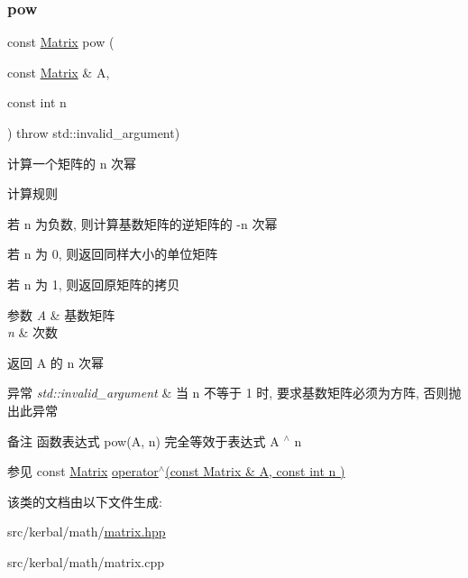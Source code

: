 \subsubsection{\texorpdfstring{pow}{pow}}
{\footnotesize\ttfamily const \hyperlink{classkerbal_1_1math_1_1_matrix}{Matrix} pow (\begin{DoxyParamCaption}\item[{const \hyperlink{classkerbal_1_1math_1_1_matrix}{Matrix} \&}]{A,  }\item[{const int}]{n }\end{DoxyParamCaption}) throw  std\+::invalid\+\_\+argument) \hspace{0.3cm}{\ttfamily [friend]}}



计算一个矩阵的 n 次幂 

\begin{DoxyParagraph}{计算规则}

\begin{DoxyItemize}
\item 若 n 为负数, 则计算基数矩阵的逆矩阵的 -\/n 次幂~\newline

\item 若 n 为 0, 则返回同样大小的单位矩阵~\newline

\item 若 n 为 1, 则返回原矩阵的拷贝 
\end{DoxyItemize}
\end{DoxyParagraph}

\begin{DoxyParams}{参数}
{\em A} & 基数矩阵 \\
\hline
{\em n} & 次数 \\
\hline
\end{DoxyParams}
\begin{DoxyReturn}{返回}
A 的 n 次幂 
\end{DoxyReturn}

\begin{DoxyExceptions}{异常}
{\em std\+::invalid\+\_\+argument} & 当 n 不等于 1 时, 要求基数矩阵必须为方阵, 否则抛出此异常 \\
\hline
\end{DoxyExceptions}
\begin{DoxyRemark}{备注}
函数表达式 pow(\+A, n) 完全等效于表达式 A $^\wedge$ n 
\end{DoxyRemark}
\begin{DoxySeeAlso}{参见}
const \hyperlink{classkerbal_1_1math_1_1_matrix}{Matrix} \hyperlink{classkerbal_1_1math_1_1_matrix_af46d90e12227e9e1e8c8242cb2b0a93a}{operator$^\wedge$(const Matrix \& A, const int n )} 
\end{DoxySeeAlso}


该类的文档由以下文件生成\+:\begin{DoxyCompactItemize}
\item 
src/kerbal/math/\hyperlink{matrix_8hpp}{matrix.\+hpp}\item 
src/kerbal/math/matrix.\+cpp\end{DoxyCompactItemize}
